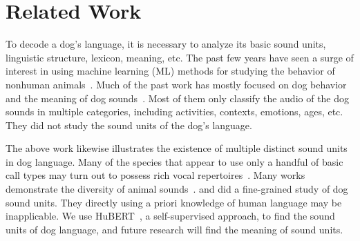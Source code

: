\section{Related Work}

To decode a dog's language, it is necessary to analyze its basic sound units, linguistic structure, lexicon, meaning, etc. 
The past few years have seen a surge of interest in using machine learning (ML) methods for studying the behavior of nonhuman animals~\citep{rutz2023using}. 
Much of the past work has mostly focused on dog behavior~\citep{ide2021rescue,ehsani2018let} and the meaning of dog sounds~\citep{molnar2008classification,hantke2018my,larranaga2015comparing,hantke2018my,pongracz2006acoustic}. 
Most of them only classify the audio of the dog sounds in multiple categories, including activities, contexts, emotions, ages, etc.
They did not study the sound units of the dog's language.

The above work likewise illustrates the existence of multiple distinct sound units in dog language. Many of the species that appear to use only a handful of basic call types may turn out to possess rich vocal repertoires~\citep{rutz2023using}. Many works demonstrate the diversity of animal sounds~\citep{paladini2020bark,robbins2000vocal,bermant2019deep}. \citet{huang2023transcribing} and \citet{wang2023towards} did a fine-grained study of dog sound units. They directly using a priori knowledge of human language may be inapplicable.
We use HuBERT~\citep{hsu2021hubert}, a self-supervised approach, to find the sound units of dog language, and future research will find the meaning of sound units.
